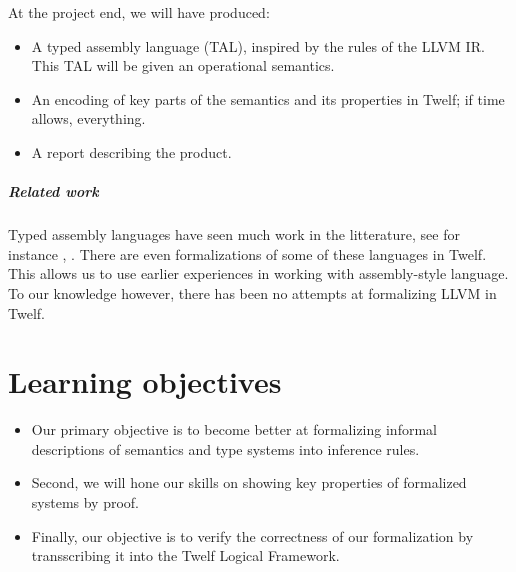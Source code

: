 \documentclass[a4paper, oneside, 10pt, final]{memoir}
\begin{document}
At the project end, we will have produced:
\begin{itemize}
\item A typed assembly language (TAL), inspired by the rules of the LLVM
  IR. This TAL will be given an operational semantics.
\item An encoding of key parts of the semantics and its properties in
  Twelf; if time allows, everything.
\item A report describing the product.
\end{itemize}

\paragraph{Related work}

Typed assembly languages have seen much work in the litterature, see
for instance \cite{crary:2003:toward},
\cite{morrisett.crary.ea:1999:talx86}. There are even formalizations
of some of these languages in Twelf. This allows us to use earlier
experiences in working with assembly-style language. To our knowledge
however, there has been no attempts at formalizing LLVM in Twelf.

\chapter*{Learning objectives}

\begin{itemize}
\item Our primary objective is to become better at formalizing informal
  descriptions of semantics and type systems into inference rules.
\item Second, we will hone our skills on showing key properties of
  formalized systems by proof.
\item Finally, our objective is to verify the correctness of our
  formalization by transscribing it into the Twelf Logical Framework.
\end{itemize}


\end{document}
